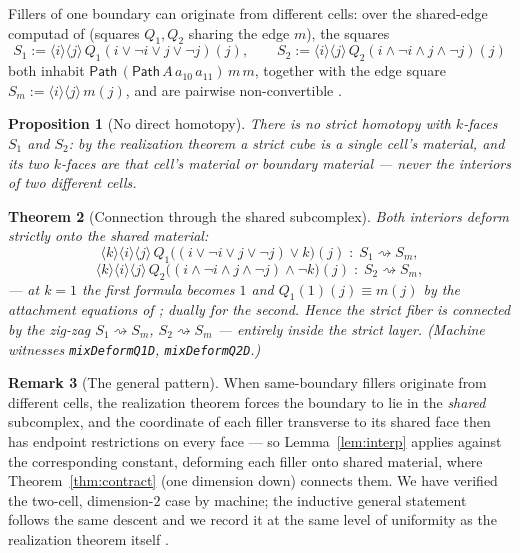 \documentclass[11pt]{amsart}
\newtheorem{thm}{Theorem}[section]
\newtheorem{prop}[thm]{Proposition}
\theoremstyle{definition}
\newtheorem{rem}[thm]{Remark}
\newcommand{\aconv}{\equiv}
\newcommand{\Path}{\mathsf{Path}}
\begin{document}
Fillers of one boundary can originate from different cells: over
the shared-edge computad of \cite{Realization} (squares $Q_1, Q_2$
sharing the edge $m$), the squares
\[
  S_1 := \langle i \rangle \langle j \rangle\,
  Q_1(i \vee \neg i \vee j \vee \neg j)(j),
  \qquad
  S_2 := \langle i \rangle \langle j \rangle\,
  Q_2(i \wedge \neg i \wedge j \wedge \neg j)(j)
\]
both inhabit $\Path\,(\Path\,A\,a_{10}\,a_{11})\,m\,m$, together
with the edge square
$S_m := \langle i \rangle \langle j \rangle\, m(j)$, and are
pairwise non-convertible \cite{Realization}.

\begin{prop}[No direct homotopy]\label{prop:nodirect}
  There is no strict homotopy with $k$-faces $S_1$ and $S_2$: by
  the realization theorem a strict cube is a single cell's
  material, and its two $k$-faces are that cell's material or
  boundary material --- never the interiors of two different
  cells.
\end{prop}

\begin{thm}[Connection through the shared subcomplex]
  \label{thm:zigzag}
  Both interiors deform strictly onto the shared material:
  \[
    \langle k \rangle \langle i \rangle \langle j \rangle\,
    Q_1\bigl((i \vee \neg i \vee j \vee \neg j) \vee k\bigr)(j)
    \;:\; S_1 \rightsquigarrow S_m,
  \]
  \[
    \langle k \rangle \langle i \rangle \langle j \rangle\,
    Q_2\bigl((i \wedge \neg i \wedge j \wedge \neg j) \wedge
    \neg k\bigr)(j)
    \;:\; S_2 \rightsquigarrow S_m,
  \]
  --- at $k = 1$ the first formula becomes $1$ and
  $Q_1(1)(j) \aconv m(j)$ by the attachment equations of
  \cite{Realization}; dually for the second.  Hence the strict
  fiber is connected by the zig-zag
  $S_1 \rightsquigarrow S_m$, $S_2 \rightsquigarrow S_m$ --- entirely inside
  the strict layer.  (Machine witnesses \texttt{mixDeformQ1D},
  \texttt{mixDeformQ2D}.)
\end{thm}

\begin{rem}[The general pattern]\label{rem:descent}
  When same-boundary fillers originate from different cells, the
  realization theorem forces the boundary to lie in the
  \emph{shared} subcomplex, and the coordinate of each filler
  transverse to its shared face then has endpoint restrictions on
  every face --- so Lemma~\ref{lem:interp} applies against the
  corresponding constant, deforming each filler onto shared
  material, where Theorem~\ref{thm:contract} (one dimension down)
  connects them.  We have verified the two-cell, dimension-$2$
  case by machine; the inductive general statement follows the
  same descent and we record it at the same level of uniformity as
  the realization theorem itself \cite[Rem.~5.4]{Realization}.
\end{rem}
\end{document}
